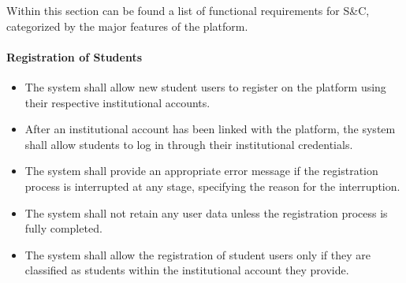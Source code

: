 


Within this section can be found a list of functional requirements for S\&C, categorized by the major features of the platform.

\paragraph{Registration of Students}
\begin{itemize}[label={[\textbf{FR}]}, align=left, leftmargin=*]
    \item {} The system shall allow new student users to register on the platform using their respective institutional accounts.
    \item {} After an institutional account has been linked with the platform, the system shall allow students to log in through their institutional credentials.
    \item {} The system shall provide an appropriate error message if the registration process is interrupted at any stage, specifying the reason for the interruption. 
    \item {} The system shall not retain any user data unless the registration process is fully completed.
    \item {} The system shall allow the registration of student users only if they are classified as students within the institutional account they provide.
\end{itemize}

